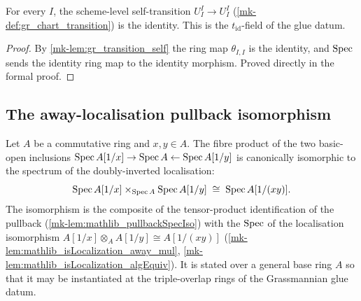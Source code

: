 \begin{lemma}\label{mk-lem:gr_chartTransition_self}
  \leanok

  For every \(I\), the scheme-level self-transition
  \(U^I_I \to U^I_I\) (\ref{mk-def:gr_chart_transition}) is the identity. This is
  the \(t_{\mathrm{id}}\)-field of the glue datum.
\end{lemma}
\begin{proof}
  \leanok
  By \ref{mk-lem:gr_transition_self} the ring map \(\theta_{I,I}\) is the identity,
  and \(\operatorname{Spec}\) sends the identity ring map to the identity morphism. Proved
  directly in the formal proof.
\end{proof}

\subsection*{The away-localisation pullback isomorphism}

\begin{definition}\label{mk-def:gr_away_pullback_iso}
  \leanok

  Let \(A\) be a commutative ring and \(x, y \in A\). The fibre product of the two
  basic-open inclusions \(\operatorname{Spec} A[1/x] \to \operatorname{Spec} A \leftarrow \operatorname{Spec} A[1/y]\) is
  canonically isomorphic to the spectrum of the doubly-inverted localisation:
  \[
    \operatorname{Spec} A[1/x] \times_{\operatorname{Spec} A} \operatorname{Spec} A[1/y]
      \;\cong\; \operatorname{Spec} A[1/(xy)].
  \]
  The isomorphism is the composite of the tensor-product identification of the
  pullback (\ref{mk-lem:mathlib_pullbackSpecIso}) with the \(\operatorname{Spec}\) of the
  localisation isomorphism
  \(A[1/x] \otimes_A A[1/y] \cong A[1/(xy)]\)
  (\ref{mk-lem:mathlib_isLocalization_away_mul},
  \ref{mk-lem:mathlib_isLocalization_algEquiv}). It is stated over a general base
  ring \(A\) so that it may be instantiated at the triple-overlap rings of the
  Grassmannian glue datum.
\end{definition}


